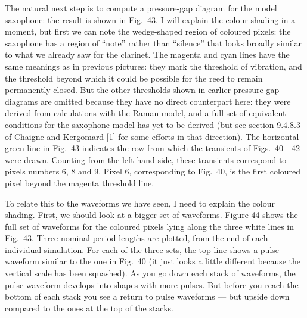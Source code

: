   The natural next step is to compute a pressure-gap diagram for the model 
  saxophone: the result is shown in Fig.\ 43. I will explain the colour shading 
  in a moment, but first we can note the wedge-shaped region of coloured 
  pixels: the saxophone has a region of “note” rather than “silence” that looks 
  broadly similar to what we already saw for the clarinet. The magenta and cyan 
  lines have the same meanings as in previous pictures: they mark the threshold 
  of vibration, and the threshold beyond which it could be possible for the 
  reed to remain permanently closed. But the other thresholds shown in earlier 
  pressure-gap diagrams are omitted because they have no direct counterpart 
  here: they were derived from calculations with the Raman model, and a full 
  set of equivalent conditions for the saxophone model has yet to be derived 
  (but see section 9.4.8.3 of Chaigne and Kergomard [1] for some efforts in 
  that direction). The horizontal green line in Fig.\ 43 indicates the row from 
  which the transients of Figs.\ 40—42 were drawn. Counting from the left-hand 
  side, these transients correspond to pixels numbers 6, 8 and 9. Pixel 6, 
  corresponding to Fig.\ 40, is the first coloured pixel beyond the magenta 
  threshold line. 


  To relate this to the waveforms we have seen, I need to explain the colour 
  shading. First, we should look at a bigger set of waveforms. Figure 44 shows 
  the full set of waveforms for the coloured pixels lying along the three white 
  lines in Fig.\ 43. Three nominal period-lengths are plotted, from the end of 
  each individual simulation. For each of the three sets, the top line shows a 
  pulse waveform similar to the one in Fig.\ 40 (it just looks a little 
  different because the vertical scale has been squashed). As you go down each 
  stack of waveforms, the pulse waveform develops into shapes with more pulses. 
  But before you reach the bottom of each stack you see a return to pulse 
  waveforms — but upside down compared to the ones at the top of the stacks. 

